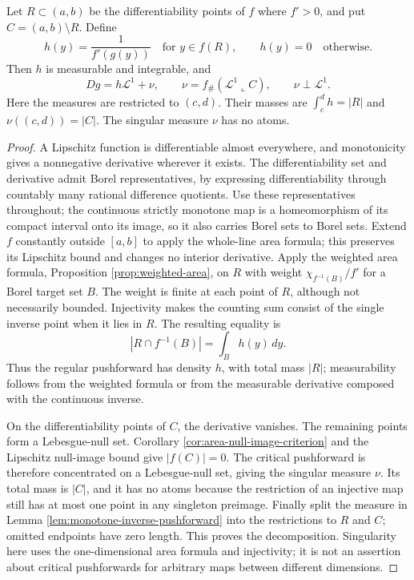 \begin{theorem}\label{thm:monotone-inverse-derivative-decomposition}
Let $R\subset(a,b)$ be the differentiability points of $f$ where $f'>0$, and put $C=(a,b)\setminus R$. Define
\[
 h(y)=\frac1{f'(g(y))}\quad\text{for }y\in f(R),
 \qquad h(y)=0\quad\text{otherwise}.
\]
Then $h$ is measurable and integrable, and
\[
 Dg=h\mathcal L^1+\nu,
 \qquad \nu=f_\#(\mathcal L^1\llcorner C),
 \qquad \nu\perp\mathcal L^1.
\]
Here the measures are restricted to $(c,d)$. Their masses are $\int_c^dh=|R|$ and $\nu((c,d))=|C|$. The singular measure $\nu$ has no atoms.
\end{theorem}
\begin{proof}
A Lipschitz function is differentiable almost everywhere, and monotonicity gives a nonnegative derivative wherever it exists. The differentiability set and derivative admit Borel representatives, by expressing differentiability through countably many rational difference quotients. Use these representatives throughout; the continuous strictly monotone map is a homeomorphism of its compact interval onto its image, so it also carries Borel sets to Borel sets. Extend $f$ constantly outside $[a,b]$ to apply the whole-line area formula; this preserves its Lipschitz bound and changes no interior derivative. Apply the weighted area formula, Proposition \ref{prop:weighted-area}, on $R$ with weight $\chi_{f^{-1}(B)}/f'$ for a Borel target set $B$. The weight is finite at each point of $R$, although not necessarily bounded. Injectivity makes the counting sum consist of the single inverse point when it lies in $R$. The resulting equality is
\[
 |R\cap f^{-1}(B)|=\int_Bh(y)\,dy.
\]
Thus the regular pushforward has density $h$, with total mass $|R|$; measurability follows from the weighted formula or from the measurable derivative composed with the continuous inverse.

On the differentiability points of $C$, the derivative vanishes. The remaining points form a Lebesgue-null set. Corollary \ref{cor:area-null-image-criterion} and the Lipschitz null-image bound give $|f(C)|=0$. The critical pushforward is therefore concentrated on a Lebesgue-null set, giving the singular measure $\nu$. Its total mass is $|C|$, and it has no atoms because the restriction of an injective map still has at most one point in any singleton preimage. Finally split the measure in Lemma \ref{lem:monotone-inverse-pushforward} into the restrictions to $R$ and $C$; omitted endpoints have zero length. This proves the decomposition. Singularity here uses the one-dimensional area formula and injectivity; it is not an assertion about critical pushforwards for arbitrary maps between different dimensions.
\end{proof}

